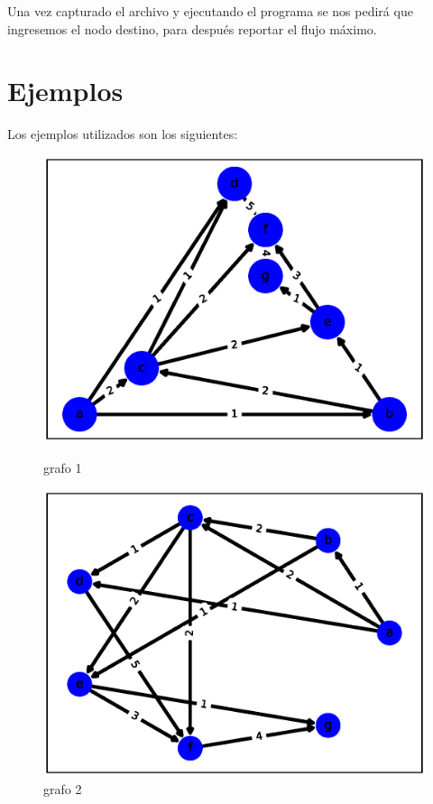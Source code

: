 \documentclass{report}
\begin{document}
Una vez capturado el archivo y ejecutando el programa se nos pedirá que ingresemos el nodo destino, para después reportar el flujo máximo.

\section{Ejemplos}
Los ejemplos utilizados son los siguientes:

\begin{figure}[h!t]
\centering
\begin{minipage}[b]{0.4\linewidth}
\centering
\includegraphics[scale = 0.35]{ejemplo3.eps}
\caption{grafo 1}
\label{fig:1}
\end{minipage}
\hspace{0.5 cm}
\begin{minipage}[b]{0.4\linewidth}
  \centering
  \includegraphics[scale = 0.35]{ejemplo7.eps}
  \caption{grafo 2}
  \label{fig:2}
\end{minipage}
\end{figure}
\end{document}
